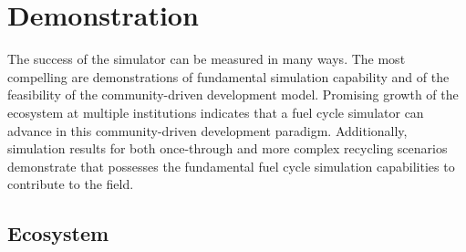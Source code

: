 \section{Demonstration}
%

%



The success of the \Cyclus simulator can be measured in many ways.  The most
compelling are demonstrations of fundamental simulation capability and of the
feasibility of the \Cyclus community-driven development model. Promising
growth of the \Cyclus ecosystem at multiple institutions indicates that a fuel
cycle simulator can advance in this community-driven development
paradigm. Additionally, simulation results for both once-through and more
complex recycling scenarios demonstrate that \Cyclus possesses the fundamental
fuel cycle simulation capabilities to contribute to the field.

\subsection{Ecosystem}

